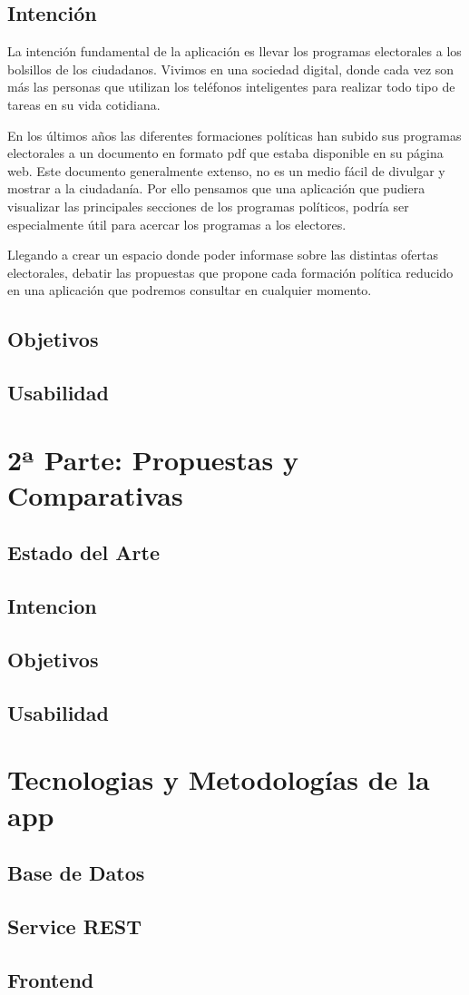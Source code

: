 	\subsection{Intención}

La intención fundamental de la aplicación es llevar los programas electorales a los bolsillos de los ciudadanos. Vivimos en una sociedad digital, donde cada vez son más las personas que utilizan los teléfonos inteligentes para realizar todo tipo de tareas en su vida cotidiana.

En los últimos años las diferentes formaciones políticas han subido sus programas electorales a un documento en formato pdf que estaba disponible en su página web. Este documento generalmente extenso, no es un medio fácil de divulgar y mostrar a la ciudadanía. Por ello pensamos que una aplicación que pudiera visualizar las principales secciones de los programas políticos, podría ser especialmente útil para acercar los programas a los electores.

Llegando a crear un espacio donde poder informase sobre las distintas ofertas electorales, debatir las propuestas que propone cada formación política reducido en una aplicación que podremos consultar en cualquier momento.
  
	\subsection{Objetivos}
	\subsection{Usabilidad}


  
\section{2ª Parte: Propuestas y Comparativas}
  \subsection{Estado del Arte}

  \subsection{Intencion}
  \subsection{Objetivos}
  \subsection{Usabilidad}

  
  
\section{Tecnologias y Metodologías de la app}

  \subsection{Base de Datos}
  \subsection{Service REST}

  \subsection{Frontend}
